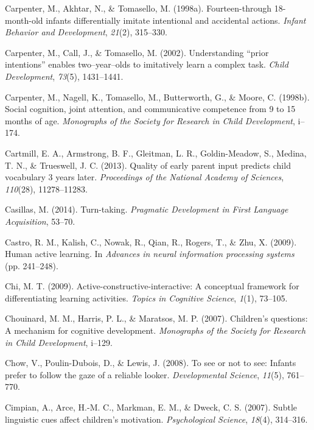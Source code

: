 \documentclass[oneside]{report}
\begin{document}
\leavevmode\hypertarget{ref-carpenter1998fourteen}{}%
Carpenter, M., Akhtar, N., \& Tomasello, M. (1998a). Fourteen-through
18-month-old infants differentially imitate intentional and accidental
actions. \emph{Infant Behavior and Development}, \emph{21}(2), 315--330.

\leavevmode\hypertarget{ref-carpenter2002understanding}{}%
Carpenter, M., Call, J., \& Tomasello, M. (2002). Understanding ``prior
intentions'' enables two--year--olds to imitatively learn a complex
task. \emph{Child Development}, \emph{73}(5), 1431--1441.

\leavevmode\hypertarget{ref-carpenter1998social}{}%
Carpenter, M., Nagell, K., Tomasello, M., Butterworth, G., \& Moore, C.
(1998b). Social cognition, joint attention, and communicative competence
from 9 to 15 months of age. \emph{Monographs of the Society for Research
in Child Development}, i--174.

\leavevmode\hypertarget{ref-cartmill2013quality}{}%
Cartmill, E. A., Armstrong, B. F., Gleitman, L. R., Goldin-Meadow, S.,
Medina, T. N., \& Trueswell, J. C. (2013). Quality of early parent input
predicts child vocabulary 3 years later. \emph{Proceedings of the
National Academy of Sciences}, \emph{110}(28), 11278--11283.

\leavevmode\hypertarget{ref-casillas2014turn}{}%
Casillas, M. (2014). Turn-taking. \emph{Pragmatic Development in First
Language Acquisition}, 53--70.

\leavevmode\hypertarget{ref-castro2009human}{}%
Castro, R. M., Kalish, C., Nowak, R., Qian, R., Rogers, T., \& Zhu, X.
(2009). Human active learning. In \emph{Advances in neural information
processing systems} (pp. 241--248).

\leavevmode\hypertarget{ref-chi2009active}{}%
Chi, M. T. (2009). Active-constructive-interactive: A conceptual
framework for differentiating learning activities. \emph{Topics in
Cognitive Science}, \emph{1}(1), 73--105.

\leavevmode\hypertarget{ref-chouinard2007children}{}%
Chouinard, M. M., Harris, P. L., \& Maratsos, M. P. (2007). Children's
questions: A mechanism for cognitive development. \emph{Monographs of
the Society for Research in Child Development}, i--129.

\leavevmode\hypertarget{ref-chow2008see}{}%
Chow, V., Poulin-Dubois, D., \& Lewis, J. (2008). To see or not to see:
Infants prefer to follow the gaze of a reliable looker.
\emph{Developmental Science}, \emph{11}(5), 761--770.

\leavevmode\hypertarget{ref-cimpian2007subtle}{}%
Cimpian, A., Arce, H.-M. C., Markman, E. M., \& Dweck, C. S. (2007).
Subtle linguistic cues affect children's motivation. \emph{Psychological
Science}, \emph{18}(4), 314--316.
\end{document}
